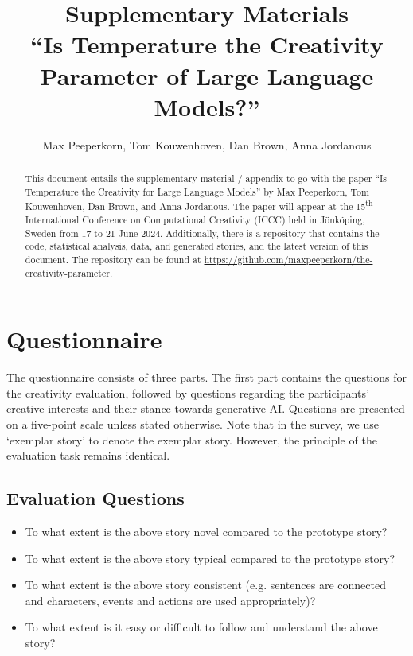 \documentclass[a4paper]{article}
\title{%
Supplementary Materials \\ 
``Is Temperature the Creativity Parameter of Large Language Models?''}
\author{Max Peeperkorn, Tom Kouwenhoven, Dan Brown, Anna Jordanous}
\begin{document}
\maketitle

\begin{abstract}
This document entails the supplementary material / appendix to go with the paper ``Is Temperature the Creativity for Large Language Models'' by Max Peeperkorn, Tom Kouwenhoven, Dan Brown, and Anna Jordanous. The paper will appear at the 15\textsuperscript{th} International Conference on Computational Creativity (ICCC) held in J\"onk\"oping, Sweden from 17 to 21 June 2024. Additionally, there is a repository that contains the code, statistical analysis, data, and generated stories, and the latest version of this document. The repository can be found at \url{https://github.com/maxpeeperkorn/the-creativity-parameter}.
\end{abstract}
    
\appendix

\section{Questionnaire}\label{app:questionnaire}
The questionnaire consists of three parts. The first part contains the questions for the creativity evaluation, followed by questions regarding the participants' creative interests and their stance towards generative AI.
Questions are presented on a five-point scale unless stated otherwise.
Note that in the survey, we use `exemplar story' to denote the exemplar story. However, the principle of the evaluation task remains identical.

\subsection*{Evaluation Questions}
\begin{itemize}
    \item To what extent is the above story novel compared to the prototype story?
    \item To what extent is the above story typical compared to the prototype story?
    \item To what extent is the above story consistent (e.g. sentences are connected and characters, events and actions are used appropriately)?
    \item To what extent is it easy or difficult to follow and understand the above story?
\end{itemize}
\end{document}
